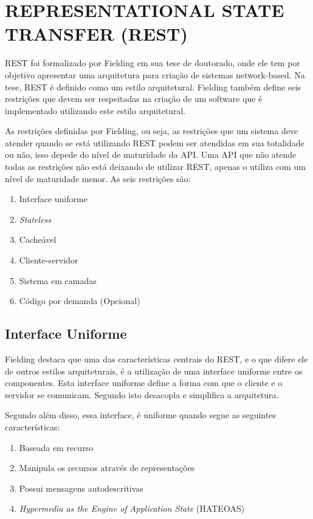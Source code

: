\section{REPRESENTATIONAL STATE TRANSFER (REST)}
REST foi formalizado por Fielding \cite{fielding} em sua tese de doutorado, onde ele tem por 
objetivo apresentar uma arquitetura para criação de sistemas network-based. 
Na tese, REST é definido como um estilo arquitetural. Fielding também define seis restrições que 
devem ser respeitadas na criação de um software que é implementado utilizando este estilo arquitetural. 



As restrições definidas por Fielding, ou seja, as restrições que um sistema
deve atender quando se está utilizando REST podem ser atendidas em sua totalidade
ou não, isso depede do nível de maturidade da API. Uma API que não atende todas as restrições
não está deixando de utilizar REST, apenas o utiliza com um nível de maturidade
menor. As seis restrições são:

\begin{enumerate}
  \item Interface uniforme
  \item \textit{Stateless}
  \item Cacheável
  \item Cliente-servidor
  \item Sistema em camadas
  \item Código por demanda (Opcional)
\end{enumerate}

\subsection{Interface Uniforme}

Fielding \cite{fielding} destaca que uma das características centrais do REST, e o que difere ele 
de outros estilos arquiteturais, é a utilização de uma interface uniforme entre os componentes. 
Esta interface uniforme define a forma com que o cliente e o servidor se comunicam. Segundo \cite{todd}
isto desacopla e simplifica a arquitetura.

Segundo \cite{todd} além disso, essa interface, é uniforme quando segue as seguintes características:

\begin{enumerate}
  \item Baseada em recurso
  \item Manipula os recursos através de representações
  \item Possui mensagens autodescritivas
  \item \textit{Hypermedia as the Engine of Application State} (HATEOAS)
\end{enumerate}

